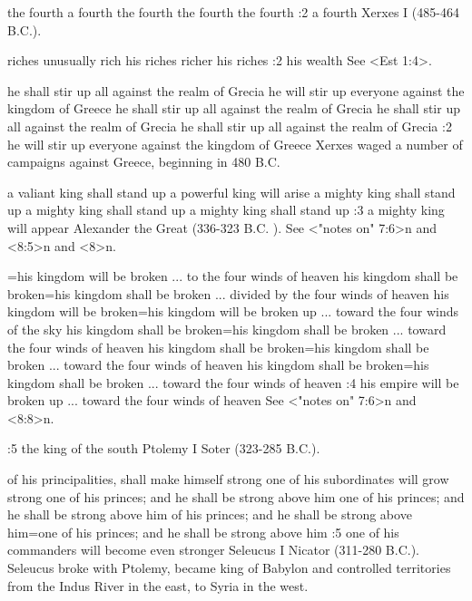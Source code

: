     {the fourth} %
    {a fourth} %
    {the fourth} %
    {the fourth} %
    {the fourth} %
:2 {a fourth} Xerxes I (485-464 B.C.). 

    {riches} %
    {unusually rich} %
    {his riches} %
    {richer} %
    {his riches} %
:2 {his wealth}  See <Est 1:4>. 

    {he shall stir up all against the realm of Grecia} %
    {he will stir up everyone against the kingdom of Greece} %
    {he shall stir up all against the realm of Grecia} %
    {he shall stir up all against the realm of Grecia} %
    {he shall stir up all against the realm of Grecia} %
:2 {he will stir up everyone against the kingdom of Greece} Xerxes waged a number of campaigns against Greece, beginning in 480 B.C. 

    {a valiant king shall stand up} %
    {a powerful king will arise} %
    {a mighty king shall stand up} %
    {a mighty king shall stand up} %
    {a mighty king shall stand up} %
:3 {a mighty king will appear} Alexander the Great (336-323 B.C. ). See <"notes on" 7:6>n and <8:5>n and <8>n.

={his kingdom will be broken ... to the four winds of heaven} %
    {his kingdom shall be broken}={his kingdom shall be broken ... divided by the four winds of heaven} %
    {his kingdom will be broken}={his kingdom will be broken up ... toward the four winds of the sky} %
    {his kingdom shall be broken}={his kingdom shall be broken ... toward the four winds of heaven} %
    {his kingdom shall be broken}={his kingdom shall be broken ... toward the four winds of heaven} %
    {his kingdom shall be broken}={his kingdom shall be broken ... toward the four winds of heaven} %
:4 {his empire will be broken up ... toward the four winds of heaven} See <"notes on" 7:6>n and <8:8>n.

:5 {the king of the south} Ptolemy I Soter (323-285 B.C.).

    {of his principalities, shall make himself strong} %
    {one of his subordinates will grow strong} %
    {one of his princes; and he shall be strong above him} %
    {one of his princes; and he shall be strong above him} %
    {of his princes; and he shall be strong above him}={one of his princes; and he shall be strong above him} %
:5 {one of his commanders will become even stronger}
Seleucus I Nicator (311-280 B.C.). Seleucus broke with Ptolemy, became king of 
Babylon and controlled territories from the Indus River in the east, to Syria in the west.

